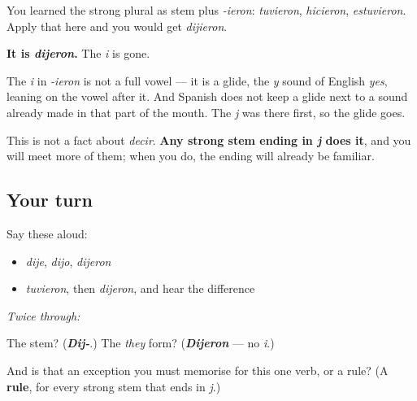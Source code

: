 \begin{grammarlens}[title={Grammar Lens: where it breaks the pattern}]
You learned the strong plural as stem plus \emph{-ieron}: \emph{tuvieron}, \emph{hicieron}, \emph{estuvieron}. Apply that here and you would get \emph{dijieron}.

\textbf{It is \emph{dijeron}.} The \emph{i} is gone.

The \emph{i} in \emph{-ieron} is not a full vowel — it is a glide, the \emph{y} sound of English \emph{yes}, leaning on the vowel after it. And Spanish does not keep a glide next to a sound already made in that part of the mouth. The \emph{j} was there first, so the glide goes.

This is not a fact about \emph{decir}. \textbf{Any strong stem ending in \emph{j} does it}, and you will meet more of them; when you do, the ending will already be familiar.
\end{grammarlens}

\subsection*{Your turn}
Say these aloud:

\begin{itemize}
\raggedright
  \item \emph{dije}, \emph{dijo}, \emph{dijeron}
  \item \emph{tuvieron}, then \emph{dijeron}, and hear the difference
\end{itemize}

\emph{Twice through:}

\begin{tcolorbox}[breakable,colback=teal!4,colframe=teal!35!black,title={Before you move on}]
The stem? (\emph{\textbf{Dij-}}.) The \emph{they} form? (\emph{\textbf{Dijeron}} — no \emph{i}.)

And is that an exception you must memorise for this one verb, or a rule? (A \textbf{rule}, for every strong stem that ends in \emph{j}.)
\end{tcolorbox}
